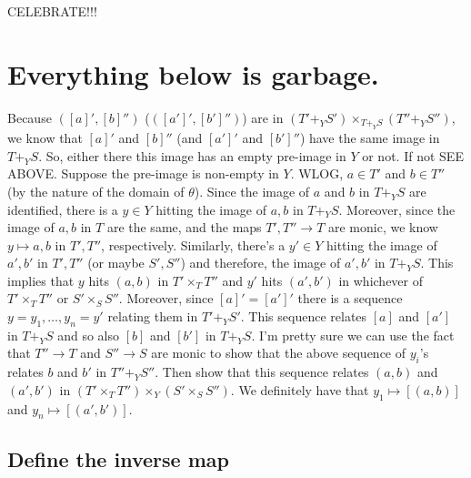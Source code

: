 \documentclass[12pt]{article}
\renewcommand{\(}{\left(}
\renewcommand{\)}{\right)}
\renewcommand{\{}{\left\lbrace}
\renewcommand{\}}{\right\rbrace}
\theoremstyle{remark}
\theoremstyle{definition}
\begin{document}
  CELEBRATE!!!
  
  
 
 \pagebreak 

\section*{Everything below is garbage.}


Because $([a]',[b]'')$ ($([a']',[b']'')$) are in $(T' +_Y S') \times_{T +_Y S} (T'' +_Y S'')$, we know that $[a]'$ and $[b]''$ (and $[a']'$ and $[b']''$) have the same image in $T +_Y S$.  So, either there this image has an empty pre-image in $Y$ or not.  If not {\color{red} SEE ABOVE}.  Suppose the pre-image is non-empty in $Y$. WLOG, $a \in T'$ and $b \in T''$ (by the nature of the domain of $\theta$).  Since the image of $a$ and $b$ in $T +_Y S$ are identified, there is a $y \in Y$ hitting the image of $a,b$ in $T +_Y S$. Moreover, since the image of $a,b$ in $T$ are the same, and the maps $T',T'' \to T$ are monic, we know $y \mapsto a,b$ in $T',T''$, respectively.  Similarly, there's a $y' \in Y$ hitting the image of $a',b'$ in $T',T''$ (or maybe $S',S''$) and therefore, the image of $a',b'$ in $T +_Y S$. This implies that $y$ hits $(a,b)$ in $T' \times_T T''$ and $y'$ hits $(a',b')$ in whichever of $T' \times_T T''$ or $S' \times_S S''$. Moreover, since $[a]'=[a']'$ there is a sequence $y=y_1, \dotsc, y_n=y'$ relating them in $T' +_Y S'$. This sequence relates $[a]$ and $[a']$ in $T+_Y S$ and so also $[b]$ and $[b']$ in $T+_YS$. I'm pretty sure we can use the fact that $T'' \to T$ and $S'' \to S$ are monic to show that the above sequence of $y_i$'s relates $b$ and $b'$ in $T'' +_Y S''$.  Then show that this sequence relates $(a,b)$ and $(a',b')$ in $(T' \times_T T'') \times_Y (S' \times_S S'')$.  We definitely have that $y_1 \mapsto [(a,b)]$ and $y_n \mapsto [(a',b')]$.  


\subsection*{Define the inverse map}
\end{document}
